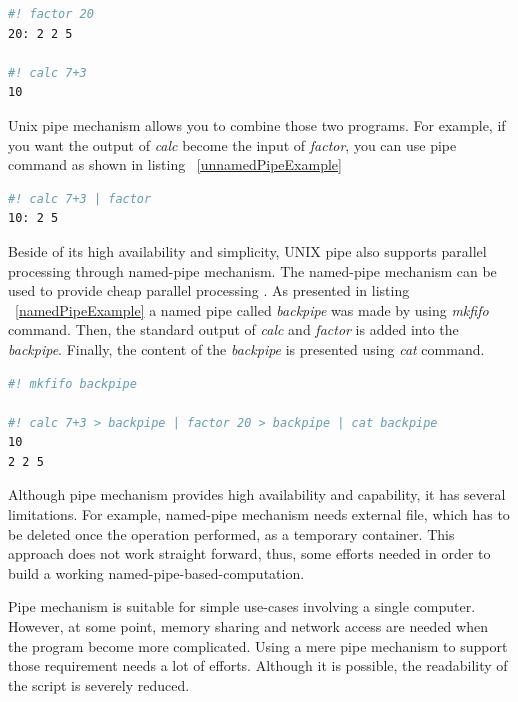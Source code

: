 \documentclass[conference]{IEEEtran}
\begin{document}
\begin{lstlisting}[caption=Usage of factor and calc, label=factorAndCalc, language=bash, basicstyle=\small, breaklines=true]
#! factor 20
20: 2 2 5

#! calc 7+3 
10
\end{lstlisting}

Unix pipe mechanism allows you to combine those two programs. For example, if you
want the output of {\it calc} become the input of {\it factor}, you can use pipe
command as shown in listing ~\ref{unnamedPipeExample}

\begin{lstlisting}[caption=Unnamed pipe example, label=unnamedPipeExample, language=bash, basicstyle=\small, breaklines=true]
#! calc 7+3 | factor
10: 2 5
\end{lstlisting}

Beside of its high availability and simplicity, UNIX pipe also supports parallel
processing through named-pipe mechanism. The named-pipe mechanism can be used to 
provide cheap parallel processing \cite{conway2003parallel}. As presented in 
listing ~\ref{namedPipeExample} a named pipe called {\it backpipe} was made by using {\it mkfifo} command. 
Then, the standard output of {\it calc} and {\it factor} is added into the {\it backpipe}. Finally, the content of the {\it backpipe} is presented using {\it cat} command.

\begin{lstlisting}[caption=Named pipe example, label=namedPipeExample, language=bash, basicstyle=\small, breaklines=true]
#! mkfifo backpipe 

#! calc 7+3 > backpipe | factor 20 > backpipe | cat backpipe
10
2 2 5
\end{lstlisting}

Although pipe mechanism provides high availability and capability, 
it has several limitations. For example, named-pipe mechanism needs external file, which has to be deleted once the operation performed, as a temporary container. This approach does not work straight forward, thus, some efforts needed in order to 
build a working named-pipe-based-computation. 

Pipe mechanism is suitable for simple use-cases involving a single computer. 
However, at some point, memory sharing  and network access are needed when the program become more complicated. 
Using a mere pipe mechanism to support those requirement needs a lot of 
efforts. Although it is possible, the readability of the script is severely reduced.
\end{document}
